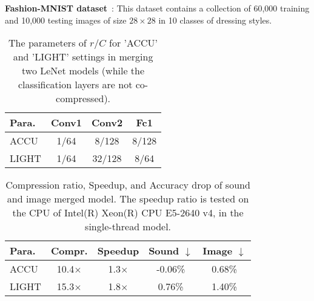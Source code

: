 \documentclass{article}
\begin{document}
	
	\noindent \textbf{Fashion-MNIST dataset}~\cite{xiao2017/online}: This dataset contains a collection of 60,000 training and 10,000 testing images of size $28\times28$ in 10 classes of dressing styles.
	
	\begin{table}[t]
		\centering
		\small
		\caption{The parameters of $r/C$ for 'ACCU' and 'LIGHT' settings in merging two LeNet models (while the classification layers are not co-compressed).}
		\label{Experimentone_param}
		\begin{tabular}{lccc}
			\toprule
			Para.       & Conv1       & Conv2      & Fc1           \\ \hline
			ACCU        & 1/64        & 8/128      & 8/128       \\
			LIGHT       & 1/64        & 32/128     & 8/64      \\
			\bottomrule
		\end{tabular}
	\end{table}
	
	
	\begin{table}[t]
		\centering
		\small
		\caption{Compression ratio, Speedup, and Accuracy drop of sound and image merged model. The speedup ratio is tested on the CPU of Intel(R) Xeon(R) CPU E5-2640 v4, in the single-thread model. %
		}
		\label{LeNetMerge}
		\begin{tabular}{lcccc}
			\toprule
			Para.   & Compr.      & Speedup                 & Sound $\downarrow$            & Image $\downarrow$  \\ \hline
			ACCU       & 10.4$\times$   & 1.3$\times$     & -0.06\%                   & 0.68\%      \\
			LIGHT       & 15.3$\times$   & 1.8$\times$    & 0.76\%                    & 1.40\%     \\
			\bottomrule
		\end{tabular}
	\end{table}
	
\end{document}
